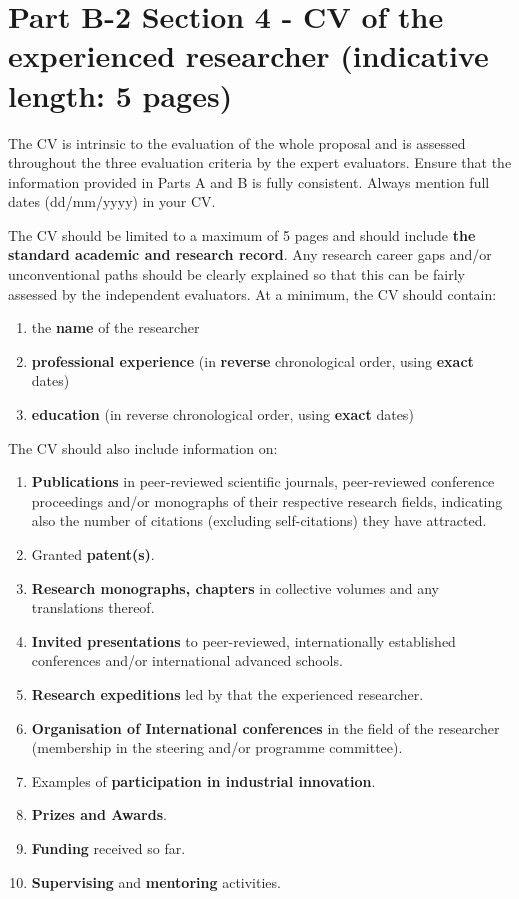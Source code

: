 
\newpage
\section*{Part B-2 Section 4 - CV of the experienced researcher (indicative length: 5 pages)}
\label{sec:cv}

The CV is intrinsic to the evaluation of the whole proposal and is assessed throughout the
three evaluation criteria by the expert evaluators. Ensure that the information provided in
Parts A and B is fully consistent. Always mention full dates (dd/mm/yyyy) in your CV.

\medskip\noindent
The CV should be limited to a maximum of 5 pages and should include \textbf{the standard
academic and research record}. Any research career gaps and/or unconventional paths
should be clearly explained so that this can be fairly assessed by the independent
evaluators. At a minimum, the CV should contain:

\begin{enumerate}[label=\alph*)]
\item the \textbf{name} of the researcher
\item \textbf{professional experience} (in \textbf{reverse} chronological order, using \textbf{exact} dates)
\item \textbf{education} (in reverse chronological order, using \textbf{exact} dates)
\end{enumerate}

\medskip\noindent
The CV should also include information on:

\begin{enumerate}
\item \textbf{Publications} in peer-reviewed scientific journals, peer-reviewed conference proceedings and/or monographs of their respective research fields, indicating also the number of citations (excluding self-citations) they have attracted.
\item Granted \textbf{patent(s)}.
\item \textbf{Research monographs, chapters} in collective volumes and any translations thereof.
\item \textbf{Invited presentations} to peer-reviewed, internationally established conferences and/or international advanced schools.
\item \textbf{Research expeditions} led by that the experienced researcher. 
\item \textbf{Organisation of International conferences} in the field of the researcher (membership in the steering and/or programme committee).
\item Examples of \textbf{participation in industrial innovation}.
\item \textbf{Prizes and Awards}.
\item \textbf{Funding} received so far.
\item \textbf{Supervising} and \textbf{mentoring} activities.
\end{enumerate}




